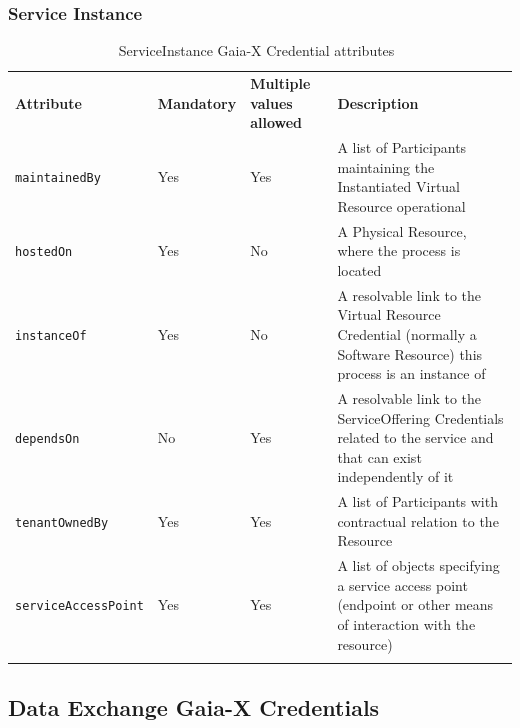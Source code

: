 \subsubsection{Service Instance}

\begin{longtable}{ |p{4cm}|p{2cm}|p{2cm}|p{7cm}| }
    \hhline{----}
    \textbf{Attribute} & \textbf{Mandatory} & \textbf{Multiple values allowed} & \textbf{Description}\\
    \hhline{----}
    \texttt{maintainedBy} & Yes & Yes & A list of Participants maintaining the Instantiated Virtual Resource operational\\
    \hhline{----}
    \texttt{hostedOn} & Yes & No & A Physical Resource, where the process is located\\
    \hhline{----}
    \texttt{instanceOf} & Yes & No & A resolvable link to the Virtual Resource Credential (normally a Software Resource) this process is an instance of\\
    \hhline{----}
    \texttt{dependsOn} & No & Yes & A resolvable link to the ServiceOffering Credentials related to the service and that can exist independently of it\\
    \hhline{----}
    \texttt{tenantOwnedBy} & Yes & Yes & A list of Participants with contractual relation to the Resource\\
    \hhline{----}
    \texttt{serviceAccessPoint} & Yes & Yes & A list of objects specifying a service access point (endpoint or other means of interaction with the resource)\\
    \hhline{----}
    \caption{ServiceInstance Gaia-X Credential attributes~\cite{gaiax_trust_framework}}
    \label{tab:service_instance}
\end{longtable}

\subsection{Data Exchange Gaia-X Credentials}\label{subsec:data-exchange-gaia-x-credentials}

